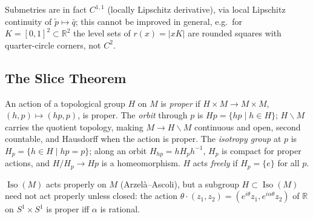 \begin{remark}
  \label{rem:pet-ch5-submetry-c11}

  Submetries are in fact $C^{1,1}$ (locally Lipschitz derivative), via local
  Lipschitz continuity of $\tilde p\mapsto\bar q$; this cannot be improved in
  general, e.g.\ for $K=[0,1]^2\subset\mathbb R^2$ the level sets of $r(x)=|xK|$ are
  rounded squares with quarter-circle corners, not $C^2$.
\end{remark}

\subsection{The Slice Theorem}

\begin{definition}
  \label{def:pet-ch5-proper-action}


  An action of a topological group $H$ on $M$ is \emph{proper} if
  $H\times M\to M\times M$, $(h,p)\mapsto(hp,p)$, is proper. The \emph{orbit}
  through $p$ is $Hp=\{hp\mid h\in H\}$; $H\backslash M$ carries the quotient
  topology, making $M\to H\backslash M$ continuous and open, second countable, and
  Hausdorff when the action is proper. The \emph{isotropy group} at $p$ is
  $H_p=\{h\in H\mid hp=p\}$; along an orbit $H_{hp}=hH_ph^{-1}$, $H_p$ is compact
  for proper actions, and $H/H_p\to Hp$ is a homeomorphism. $H$ acts \emph{freely}
  if $H_p=\{e\}$ for all $p$.
\end{definition}

\begin{example}
  \label{ex:pet-ch5-nonproper-action}

  $\operatorname{Iso}(M)$ acts properly on $M$ (Arzelà–Ascoli), but a subgroup
  $H\subset\operatorname{Iso}(M)$ need not act properly unless closed: the action
  $\theta\cdot(z_1,z_2)=(e^{i\theta}z_1,e^{i\alpha\theta}z_2)$ of $\mathbb R$ on
  $S^1\times S^1$ is proper iff $\alpha$ is rational.
\end{example}

